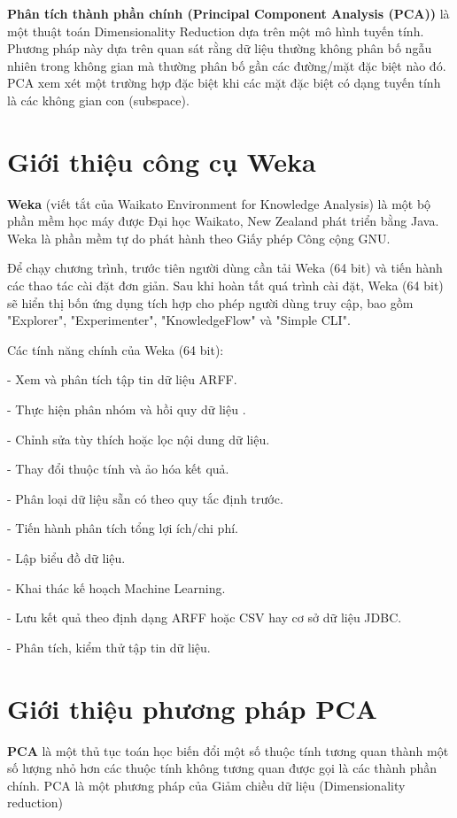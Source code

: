 \documentclass{hcmutarticle}
\begin{document}
\textbf{Phân tích thành phần chính (Principal Component Analysis (PCA))}
 là một thuật toán Dimensionality Reduction dựa trên một mô hình tuyến tính. Phương pháp này dựa trên quan sát rằng dữ liệu thường không phân bố ngẫu nhiên trong không gian mà thường phân bố gần các đường/mặt đặc biệt nào đó. PCA xem xét một trường hợp đặc biệt khi các mặt đặc biệt có dạng tuyến tính là các không gian con (subspace).

\newpage

\section{Giới thiệu công cụ Weka}\label{survey}
\textbf{Weka} (viết tắt của Waikato Environment for Knowledge Analysis) là một bộ phần mềm học máy được Đại học Waikato, New Zealand phát triển bằng Java. Weka là phần mềm tự do phát hành theo Giấy phép Công cộng GNU.

Để chạy chương trình, trước tiên người dùng cần tải Weka (64 bit) và tiến hành các thao tác cài đặt đơn giản. Sau khi hoàn tất quá trình cài đặt, Weka (64 bit) sẽ hiển thị bốn ứng dụng tích hợp cho phép người dùng truy cập, bao gồm "Explorer", "Experimenter", "KnowledgeFlow" và "Simple CLI".

Các tính năng chính của Weka (64 bit):

- Xem và phân tích tập tin dữ liệu ARFF.

- Thực hiện phân nhóm và hồi quy dữ liệu .

- Chỉnh sửa tùy thích hoặc lọc nội dung dữ liệu.

- Thay đổi thuộc tính và ảo hóa kết quả.

- Phân loại dữ liệu sẵn có theo quy tắc định trước.

- Tiến hành phân tích tổng lợi ích/chi phí.

- Lập biểu đồ dữ liệu.

- Khai thác kế hoạch Machine Learning.

- Lưu kết quả theo định dạng ARFF hoặc CSV hay cơ sở dữ liệu JDBC.

- Phân tích, kiểm thử tập tin dữ liệu.

\section{Giới thiệu phương pháp PCA}\label{dev}
\textbf{PCA} là một thủ tục toán học biến đổi một số thuộc tính tương quan thành một số lượng nhỏ hơn các thuộc tính không tương quan được gọi là các thành phần chính. PCA là một phương pháp của Giảm chiều dữ liệu (Dimensionality reduction)
\end{document}
